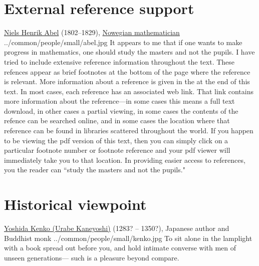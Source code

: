\section*{External reference support}
\qboxnps
  {
    \href{http://en.wikipedia.org/wiki/Niels_Henrik_Abel}{Niels Henrik Abel}
   (1802--1829),
   \href{http://www-history.mcs.st-andrews.ac.uk/BirthplaceMaps/Places/Russia.html}{Nowegian mathematician}
    \footnotemark
  }
  {../common/people/small/abel.jpg}
  {It appears to me that if one wants to make progress in mathematics,
    one should study the masters and not the pupils.}
%
I have tried to include extensive reference information throughout the text.
These refences appear as brief footnotes at the bottom of the page where
the reference is relevant.
More information about a reference is given in the  at the
end of this text.
In most cases, each reference has an associated web link.
That link contains more information about the reference---in some
cases this means a full text download, in other cases a partial viewing,
in some cases the contents of the refence can be searched online,
and in some cases the location where that reference can be found
in libraries scattered throughout the world.
If you happen to be viewing the pdf version of this text,
then you can simply click on a particular footnote number or
footnote reference and your pdf viewer will
immediately take you to that location.
In providing easier access to references,
you the reader can ``study the masters and not the pupils."


\section*{Historical viewpoint}
\qboxnps
  {
    \href{http://en.wikipedia.org/wiki/Yoshida_Kenko}{Yoshida Kenko (Urabe Kaneyoshi)}
    (1283? -- 1350?),
    Japanese author and Buddhist monk
      
      
    \footnotemark
  }
  {../common/people/small/kenko.jpg}
  {To sit alone in the lamplight with a book spread out before you,
   and hold intimate converse with men of unseen generations---
   such is a pleasure beyond compare.}


